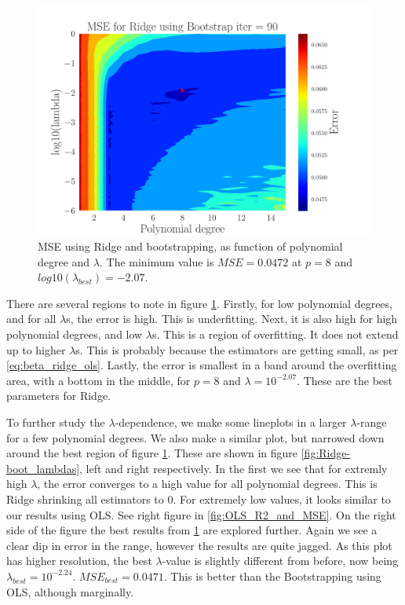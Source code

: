 \documentclass[reprint,english,notitlepage,aps,nobalancelastpage,nofootinbib]{revtex4-1}  %
\begin{document}
\begin{figure}[h]
	\begin{center}
		\includegraphics[width=0.8\linewidth]{Contour_PL_Ridge_Bootstrap90_n30_eps0.2_p1_15_lmb0_m6.pdf}
	\end{center}
	\caption{MSE using Ridge and bootstrapping, as function of polynomial degree and $\lambda$. The minimum value is $MSE=0.0472$ at $p=8$ and $log10(\lambda_{best}) = -2.07$.}
	\label{fig:Ridge-boot_heatmap}
\end{figure}

There are several regions to note in figure \ref{fig:Ridge-boot_heatmap}. Firstly, for low polynomial degrees, and for all $\lambda$s, the error is high. This is underfitting. Next, it is also high for high polynomial degrees, and low $\lambda$s. This is a region of overfitting. It does not extend up to higher $\lambda$s. This is probably because the estimators are getting small, as per \eqref{eq:beta_ridge_ols}. Lastly, the error is smallest in a band around the overfitting area, with a bottom in the middle, for $p=8$ and $\lambda=10^{-2.07}$. These are the best parameters for Ridge.

To further study the $\lambda$-dependence, we make some lineplots in a larger $\lambda$-range for a few polynomial degrees. We also make a similar plot, but narrowed down around the best region of figure \ref{fig:Ridge-boot_heatmap}. These are shown in figure \ref{fig:Ridge-boot_lambdas}, left and right respectively. In the first we see that for extremly high $\lambda$, the error converges to a high value for all polynomial degrees. This is Ridge shrinking all estimators to $0$.  For extremely low values, it looks similar to our results using OLS. See right figure in \ref{fig:OLS_R2_and_MSE}. On the right side of the figure the best results from \ref{fig:Ridge-boot_heatmap} are explored further. Again we see a clear dip in error in the range, however the results are quite jagged. As this plot has higher resolution, the best $\lambda$-value is slightly different from before,  now being $\lambda_{best} = 10^{-2.24}$. $MSE_{best}=0.0471$.  This is better than the Bootstrapping using OLS, although marginally.
\end{document}
